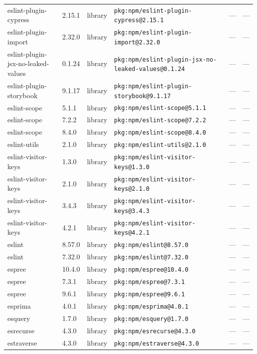 \documentclass[11pt]{article}
\begin{document}
\begin{longtable}{|l|l|l|p{2.2cm}|l|p{4cm}|}
eslint-plugin-cypress & 2.15.1 & library & \texttt{pkg:npm/eslint-plugin-cypress@2.15.1} & — & — \\
eslint-plugin-import & 2.32.0 & library & \texttt{pkg:npm/eslint-plugin-import@2.32.0} & — & — \\
eslint-plugin-jsx-no-leaked-values & 0.1.24 & library & \texttt{pkg:npm/eslint-plugin-jsx-no-leaked-values@0.1.24} & — & — \\
eslint-plugin-storybook & 9.1.17 & library & \texttt{pkg:npm/eslint-plugin-storybook@9.1.17} & — & — \\
eslint-scope & 5.1.1 & library & \texttt{pkg:npm/eslint-scope@5.1.1} & — & — \\
eslint-scope & 7.2.2 & library & \texttt{pkg:npm/eslint-scope@7.2.2} & — & — \\
eslint-scope & 8.4.0 & library & \texttt{pkg:npm/eslint-scope@8.4.0} & — & — \\
eslint-utils & 2.1.0 & library & \texttt{pkg:npm/eslint-utils@2.1.0} & — & — \\
eslint-visitor-keys & 1.3.0 & library & \texttt{pkg:npm/eslint-visitor-keys@1.3.0} & — & — \\
eslint-visitor-keys & 2.1.0 & library & \texttt{pkg:npm/eslint-visitor-keys@2.1.0} & — & — \\
eslint-visitor-keys & 3.4.3 & library & \texttt{pkg:npm/eslint-visitor-keys@3.4.3} & — & — \\
eslint-visitor-keys & 4.2.1 & library & \texttt{pkg:npm/eslint-visitor-keys@4.2.1} & — & — \\
eslint & 8.57.0 & library & \texttt{pkg:npm/eslint@8.57.0} & — & — \\
eslint & 7.32.0 & library & \texttt{pkg:npm/eslint@7.32.0} & — & — \\
espree & 10.4.0 & library & \texttt{pkg:npm/espree@10.4.0} & — & — \\
espree & 7.3.1 & library & \texttt{pkg:npm/espree@7.3.1} & — & — \\
espree & 9.6.1 & library & \texttt{pkg:npm/espree@9.6.1} & — & — \\
esprima & 4.0.1 & library & \texttt{pkg:npm/esprima@4.0.1} & — & — \\
esquery & 1.7.0 & library & \texttt{pkg:npm/esquery@1.7.0} & — & — \\
esrecurse & 4.3.0 & library & \texttt{pkg:npm/esrecurse@4.3.0} & — & — \\
estraverse & 4.3.0 & library & \texttt{pkg:npm/estraverse@4.3.0} & — & — \\

\end{longtable}
\end{document}
